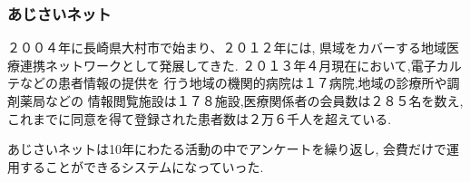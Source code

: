   \subsubsection{あじさいネット}\cite{bibi3}
    ２００４年に長崎県大村市で始まり、２０１２年には,
    県域をカバーする地域医療連携ネットワークとして発展してきた.
    ２０１３年４月現在において,電子カルテなどの患者情報の提供を
    行う地域の機関的病院は１７病院,地域の診療所や調剤薬局などの
    情報閲覧施設は１７８施設,医療関係者の会員数は２８５名を数え,
    これまでに同意を得て登録された患者数は２万６千人を超えている.

    あじさいネットは10年にわたる活動の中でアンケートを繰り返し,
    会費だけで運用することができるシステムになっていった.

